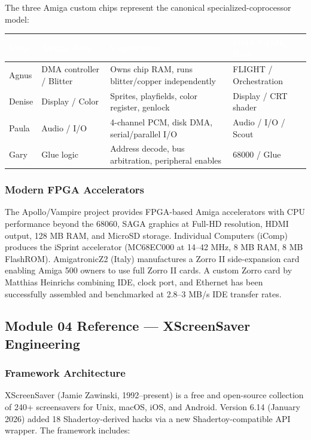 \documentclass[11pt,letterpaper]{article}
\newcommand{\tableheader}[1]{\textbf{\sffamily\textcolor{white}{#1}}}
\begin{document}
The three Amiga custom chips represent the canonical specialized-coprocessor model:

\begin{center}
\begin{tabularx}{\textwidth}{L{2cm}L{3.5cm}XL{3cm}}
\toprule
{}
\tableheader{Chip} & \tableheader{Amiga Role} & \tableheader{Capabilities} & \tableheader{GSD YAML Role} \\
\midrule
Agnus & DMA controller / Blitter & Owns chip RAM, runs blitter/copper independently & FLIGHT / Orchestration \\
Denise & Display / Color & Sprites, playfields, color register, genlock & Display / CRT shader \\
Paula & Audio / I/O & 4-channel PCM, disk DMA, serial/parallel I/O & Audio / I/O / Scout \\
Gary & Glue logic & Address decode, bus arbitration, peripheral enables & 68000 / Glue \\
\bottomrule
\end{tabularx}
\end{center}

\subsubsection{Modern FPGA Accelerators}

The Apollo/Vampire project provides FPGA-based Amiga accelerators with CPU performance beyond the 68060, SAGA graphics at Full-HD resolution, HDMI output, 128 MB RAM, and MicroSD storage. Individual Computers (iComp) produces the iSprint accelerator (MC68EC000 at 14--42 MHz, 8 MB RAM, 8 MB FlashROM). AmigatronicZ2 (Italy) manufactures a Zorro II side-expansion card enabling Amiga 500 owners to use full Zorro II cards. A custom Zorro card by Matthias Heinrichs combining IDE, clock port, and Ethernet has been successfully assembled and benchmarked at 2.8--3 MB/s IDE transfer rates.

\subsection{Module 04 Reference --- XScreenSaver Engineering}

\subsubsection{Framework Architecture}

XScreenSaver (Jamie Zawinski, 1992--present) is a free and open-source collection of 240+ screensavers for Unix, macOS, iOS, and Android. Version 6.14 (January 2026) added 18 Shadertoy-derived hacks via a new Shadertoy-compatible API wrapper. The framework includes:
\end{document}
